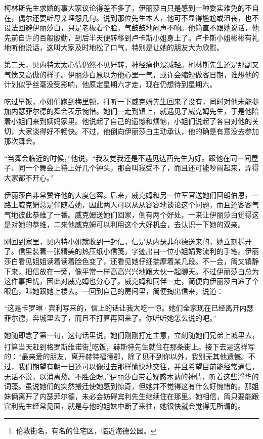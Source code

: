\par 柯林斯先生求婚的事大家议论得差不多了，伊丽莎白只是感到一种委实难免的不自在，偶尔还要听母亲埋怨几句。说到那位先生本人，他可不显得尴尬或沮丧，也不设法回避伊丽莎白，只是老板着个脸，气鼓鼓地闷声不响。他简直不跟她说话，他先前自许的百般殷勤，到后半天便转移到卢卡斯小姐身上了。卢卡斯小姐彬彬有礼地听他说话，这叫大家及时地松了口气，特别是让她的朋友大为欣慰。
\par 第二天，贝内特太太心情仍然不见好转，神经痛也没减轻。柯林斯先生还是那副又气愤又高傲的样子。伊丽莎白原以为他心里一气，或许会缩短做客日期，谁想他的计划似乎丝毫没受影响，他原定星期六才走，现在仍想待到星期六。
\par 吃过早饭，小姐们跑到梅里顿，打听一下威克姆先生回来了没有，同时对他未能参加内瑟菲尔德的舞会表示惋惜。她们一走到镇上，就遇见了威克姆先生，于是他陪着小姐们来到姨妈家里。他说起了自己的遗憾和烦恼，小姐们说起了各自对他的关切，大家谈得好不畅快。不过，他倒向伊丽莎白主动承认，他的确是有意没去参加那次舞会。
\par “当舞会临近的时候，”他说，“我发觉我还是不遇见达西先生为好。跟他在同一间屋子、同一个舞会上待上好几个钟头，那会叫我受不了，而且还可能吵闹起来，弄得大家都不开心。”
\par 伊丽莎白非常赞许他的大度包容。后来，威克姆和另一位军官送她们回朗伯恩，一路上威克姆总是伴随着她，因此两人可以从从容容地谈论这个问题，而且还客客气气地彼此恭维了一番。威克姆送她们回家，倒有两个好处，一来让伊丽莎白觉得这是对她的恭维，二来他威克姆可以利用这个大好机会，去认识一下她的双亲。
\par 刚回到家里，贝内特小姐就收到一封信，信是从内瑟菲尔德送来的，她立刻拆开了。信里装着一张精美的热压纸小信笺，字迹出自一位小姐娟秀流利的手笔。伊丽莎白看见姐姐读着读着脸色变了，还看见她仔细揣摩着某几段。不一会，简又镇静下来，把信放在一旁，像平常一样高高兴兴地跟大伙一起聊天。不过伊丽莎白总为这件事担忧，因此对威克姆也分心了。威克姆和同伴一走，简便向伊丽莎白递了个眼色，叫她跟她上楼去。一回到自己的房间里，简便掏出信来，说道：
\par “这是卡罗琳·宾利写来的，信上的话让我大吃一惊。她们全家现在已经离开内瑟菲尔德，奔城里去了，而且不打算再回来了。你听听她怎么说的吧。”
\par 她随即念了第一句，这句话里说，她们刚刚打定主意，立刻随她们兄弟上城里去，打算当天赶到格罗斯维诺街\footnote{伦敦街名，有名的住宅区，临近海德公园。}吃饭，赫斯特先生就住在那条街上。接下去是这样写的：“最亲爱的朋友，离开赫特福德郡，除了见不到你以外，我别无其他遗憾。不过，我们期望有朝一日还可以像过去那样愉快地交往，并且希望目前能经常通信，无话不说，以消离愁。不胜企盼。”伊丽莎白带着疑惑木讷的神情，听着这些浮华的词藻。虽说她们的突然搬迁使她感到惊奇，但她并不觉得这有什么好惋惜的。那姐妹俩离开了内瑟菲尔德，未必会妨碍宾利先生继续住在那里。她相信，简只要能跟宾利先生经常见面，就是与他的姐妹中断了来往，她很快就会觉得无所谓的。
